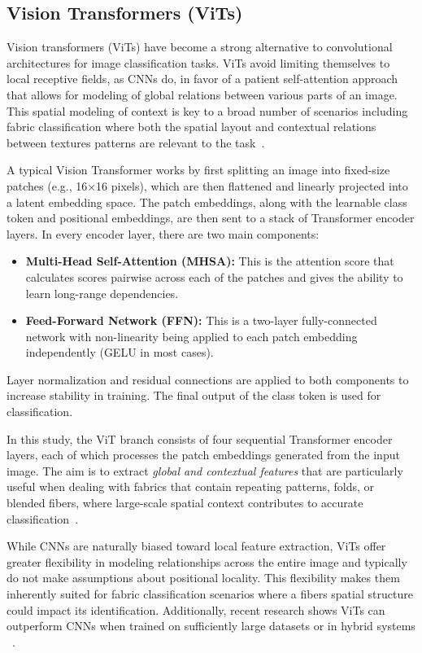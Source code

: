 \subsection{Vision Transformers (ViTs)}

Vision transformers (ViTs) have become a strong alternative to convolutional architectures for image classification tasks. ViTs avoid limiting themselves to local receptive fields, as CNNs do, in favor of a patient self-attention approach that allows for modeling of global relations between various parts of an image. This spatial modeling of context is key to a broad number of scenarios including fabric classification where both the spatial layout and contextual relations between textures patterns are relevant to the task~\cite{dosovitskiy2020vit}.

A typical Vision Transformer works by first splitting an image into fixed-size patches (e.g., 16×16 pixels), which are then flattened and linearly projected into a latent embedding space. The patch embeddings, along with the learnable class token and positional embeddings, are then sent to a stack of Transformer encoder layers. In every encoder layer, there are two main components:
\begin{itemize}
    \item \textbf{Multi-Head Self-Attention (MHSA):} This is the attention score that calculates scores pairwise across each of the patches and gives the ability to learn long-range dependencies.
    \item \textbf{Feed-Forward Network (FFN):} This is a two-layer fully-connected network with non-linearity being applied to each patch embedding independently (GELU in most cases).
\end{itemize}

Layer normalization and residual connections are applied to both components to increase stability in training. The final output of the class token is used for classification.

In this study, the ViT branch consists of four sequential Transformer encoder layers, each of which processes the patch embeddings generated from the input image. The aim is to extract \textit{global and contextual features} that are particularly useful when dealing with fabrics that contain repeating patterns, folds, or blended fibers, where large-scale spatial context contributes to accurate classification~\cite{chitra2023fabric, siam2023textilenet}.

While CNNs are naturally biased toward local feature extraction, ViTs offer greater flexibility in modeling relationships across the entire image and typically do not make assumptions about positional locality. This flexibility makes them inherently suited for fabric classification scenarios where a fibers spatial structure could impact its identification. Additionally, recent research shows ViTs can outperform CNNs when trained on sufficiently large datasets or in hybrid systems ~\cite{dosovitskiy2020vit, touvron2021training}.

